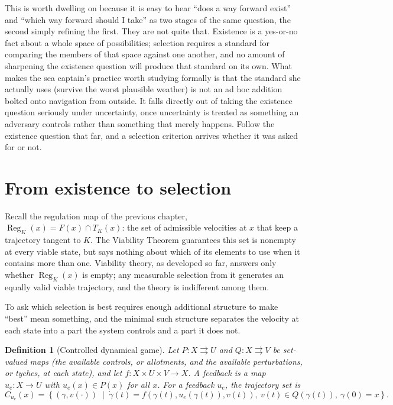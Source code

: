 \documentclass[11pt]{report}
\newtheorem{definition}{Definition}[chapter]
\begin{document}
This is worth dwelling on because it is easy to hear ``does a way
forward exist'' and ``which way forward should I take'' as two stages
of the same question, the second simply refining the first. They are
not quite that. Existence is a yes-or-no fact about a whole space of
possibilities; selection requires a standard for comparing the members
of that space against one another, and no amount of sharpening the
existence question will produce that standard on its own. What makes
the sea captain's practice worth studying formally is that the
standard she actually uses (survive the worst plausible weather) is
not an ad hoc addition bolted onto navigation from outside. It falls
directly out of taking the existence question seriously under
uncertainty, once uncertainty is treated as something an adversary
controls rather than something that merely happens. Follow the
existence question that far, and a selection criterion arrives
whether it was asked for or not.

\section*{From existence to selection}

Recall the regulation map of the previous chapter,
$\operatorname{Reg}_K(x) = F(x) \cap T_K(x)$: the set of admissible
velocities at $x$ that keep a trajectory tangent to $K$. The Viability
Theorem guarantees this set is nonempty at every viable state, but says
nothing about which of its elements to use when it contains more than
one. Viability theory, as developed so far, answers only whether
$\operatorname{Reg}_K(x)$ is empty; any measurable selection from it
generates an equally valid viable trajectory, and the theory is
indifferent among them.

To ask which selection is best requires enough additional structure to
make ``best'' mean something, and the minimal such structure separates
the velocity at each state into a part the system controls and a part
it does not.

\begin{definition}[Controlled dynamical game]
Let $P : X \rightrightarrows U$ and $Q : X \rightrightarrows V$ be
set-valued maps (the available controls, or allotments, and the
available perturbations, or tyches, at each state), and let
$f : X \times U \times V \to X$. A feedback is a map
$u_e : X \to U$ with $u_e(x) \in P(x)$ for all $x$. For a feedback
$u_e$, the trajectory set is
\[
C_{u_e}(x) = \left\{ (\gamma, v(\cdot)) \;\middle|\;
\dot\gamma(t) = f(\gamma(t), u_e(\gamma(t)), v(t)),\ v(t) \in Q(\gamma(t)),\ \gamma(0) = x \right\}.
\]
\end{definition}
\end{document}
